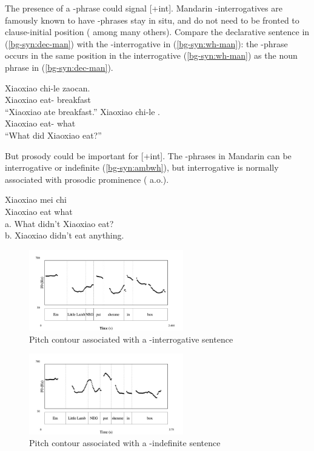 The presence of a \twh-phrase could signal [+int]. Mandarin \twh-interrogatives are famously known to have \twh-phrases stay in situ, and do not need to be fronted to clause-initial position (\citealt{huang1982, cheng1991} among many others). Compare the declarative sentence in (\ref{bg-syn:dec-man}) with the \twh-interrogative in (\ref{bg-syn:wh-man}): the \twh-phrase  occurs in the same position in the interrogative (\ref{bg-syn:wh-man}) as the noun phrase  in (\ref{bg-syn:dec-man}). 


\gll Xiaoxiao	chi-le zaocan.\\
Xiaoxiao eat-\Asp{} breakfast \\
``Xiaoxiao ate breakfast.''
\eex
{}
\gll Xiaoxiao	chi-le .\\
Xiaoxiao eat-\Asp{} what \\
``What did Xiaoxiao eat?''
\eex


But prosody could be important for [+int]. The \twh-phrases in Mandarin can be interrogative or indefinite (\ref{bg-syn:ambwh}), but interrogative \twh{} is normally associated with prosodic prominence (\cite{hu2002prosody, dong2009, yangyang2018} a.o.).

\gll Xiaoxiao	mei	chi	\\
Xiaoxiao	\Neg{}	eat	what\\
a.	What didn't Xiaoxiao eat?\\
b.	Xiaoxiao didn't eat anything.\\
\eex

\begin{figure}[H]
    \centering
    \includegraphics[width=0.6\textwidth]{figures/pitch-FC1wh.jpg}
    \caption{Pitch contour associated with a \twh-interrogative sentence}
    \label{fig:man:wh1}
\end{figure}

\begin{figure}[H]
    \centering
    \includegraphics[width=0.6\textwidth]{figures/pitch-FC0wh.jpg}
    \caption{Pitch contour associated with a \twh-indefinite sentence}
    \label{fig:man:wh0}
\end{figure}

